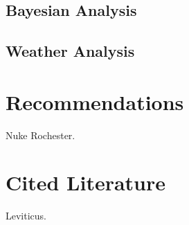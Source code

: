 \documentclass{report}
\begin{document}
\subsection*{Bayesian Analysis}
\subsection*{Weather Analysis}

\noindent\section*{Recommendations}

Nuke Rochester.

\noindent
\section*{Cited Literature}

Leviticus.
\end{document}
